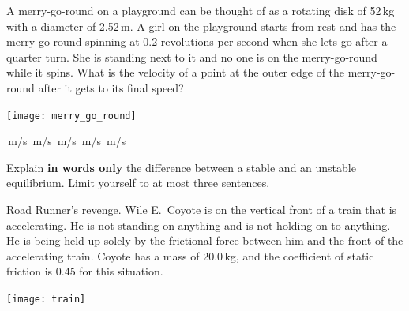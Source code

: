 \documentclass[letterpaper,addpoints,answers]{exam}
\begin{document}
\begin{questions}
\pagebreak

\question[5]
A merry-go-round on a playground can be thought of as a rotating disk of 52\,kg with a diameter of 2.52\,m. A girl on the playground starts from rest and has the merry-go-round spinning at 0.2 revolutions per second when she lets go after a quarter turn. She is standing next to it and no one is on the merry-go-round while it spins. What is the velocity of a point at the outer edge of the merry-go-round after it gets to its final speed?
\begin{center}
 \texttt{[image: merry\_go\_round]}
\end{center}
\begin{checkboxes}
 \,m/s
 \,m/s
 \,m/s
 \,m/s
 \,m/s
\end{checkboxes}

\question[5]
Explain \textbf{in words only} the difference between a stable and an unstable equilibrium. Limit yourself to at most three sentences.

\pagebreak

\question
Road Runner's revenge.  Wile E.~Coyote is on the vertical front of a train that is accelerating. He is not standing on anything and is not holding on to anything. He is being held up solely by the frictional force between him and the front of the accelerating train. Coyote has a mass of 20.0\,kg, and the coefficient of static friction is 0.45 for this situation.

\begin{center}
 \texttt{[image: train]}
\end{center}



\end{questions}
\end{document}

